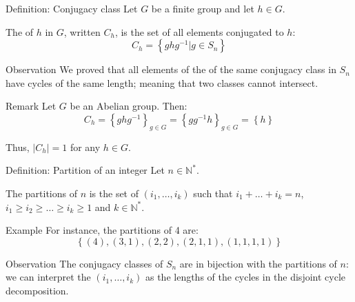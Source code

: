 \documentclass[a4paper]{article}
\begin{document}
\begin{parag}{Definition: Conjugacy class}
    Let $G$ be a finite group and let $h \in G$.

    The  of $h$ in $G$, written $C_h$, is the set of all elements conjugated to $h$: 
    \[C_h = \left\{ghg^{-1} | g \in S_n\right\}\]
    
    \begin{subparag}{Observation}
        We proved that all elements of the of the same conjugacy class in $S_n$ have cycles of the same length; meaning that two classes cannot intersect.
    \end{subparag}
    
    \begin{subparag}{Remark}
        Let $G$ be an Abelian group. Then: 
        \[C_h = \left\{g h g^{-1}\right\}_{g \in G} = \left\{g g^{-1} h\right\}_{g \in G} = \left\{h\right\}\]
        
        Thus, $\left|C_h\right| = 1$ for any $h \in G$.
    \end{subparag}
\end{parag}

\begin{parag}{Definition: Partition of an integer}
    Let $n \in \mathbb{N}^*$.

    The partitions of $n$ is the set of $\left(i_1, \ldots, i_k\right)$ such that $i_1 + \ldots + i_k = n$, $i_1 \geq i_2 \geq \ldots \geq i_k \geq 1$ and $k \in \mathbb{N}^*$.

    \begin{subparag}{Example}
        For instance, the partitions of 4 are: 
        \[\left\{\left(4\right), \left(3, 1\right), \left(2, 2\right), \left(2, 1, 1\right), \left(1, 1, 1, 1\right)\right\}\]
    \end{subparag}
\end{parag}

\begin{parag}{Observation}
    The conjugacy classes of $S_n$ are in bijection with the partitions of $n$: we can interpret the $\left(i_1, \ldots, i_k\right)$ as the lengths of the cycles in the disjoint cycle decomposition.
\end{parag}
\end{document}
